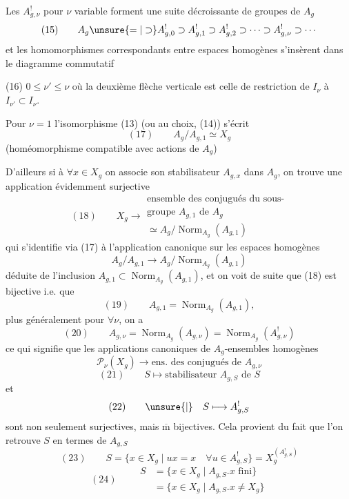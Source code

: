 Les $A_{g,\nu}^!$ pour $\nu$ variable forment une
suite décroissante de groupes de $A_g$
\[
(15)\qquad A_g\unsure{=|\supset}A_{g,0}^!\supset A_{g,1}^!\supset A_{g,2}^!
\supset\cdots\supset A_{g,\nu}^!\supset\cdots
\]
et les homomorphismes correspondants
entre espaces homogènes  s'insèrent dans le
diagramme commutatif  

(16)\quad
{}
\quad $0\leq\nu'\leq\nu$
où la deuxième flèche verticale est celle de
restriction de $I_\nu$ à $I_{\nu'}\subset I_\nu$.

Pour $\nu=1$  l'isomorphisme (13) (ou au choix,
(14)) s'écrit
\[
(17)\qquad A_g/A_{g,1}\simeq X_g
\]
(homéomorphisme compatible avec  actions de $A_g$)

D'ailleurs si à $\forall x\in X_g$ on associe son
stabilisateur $A_{g,x}$ dans $A_g$, on trouve une
application évidemment surjective
\[
(18)\qquad X_g\longrightarrow
\begin{gathered}
\text{ensemble des conjugués du sous-}\\
\text{groupe }A_{g,1}\text{ de }A_g\\
\simeq A_g/\operatorname{Norm}_{A_g}(A_{g,1})
\end{gathered}
\]
qui s'identifie via (17) à l'application canonique
sur les espaces homogènes
\[
 A_g/A_{g,1}\longrightarrow A_g/\operatorname{Norm}_{A_g}(A_{g,1})
\]
déduite de l'inclusion $A_{g,1}\subset\operatorname{Norm}_{A_g}(A_{g,1})$,
et on voit de suite que (18) est
bijective i.e. que 
\[
(19)\qquad A_{g,1}=\operatorname{Norm}_{A_g}(A_{g,1}),
\]
plus généralement pour $\forall\nu$, on a
\[
(20)\qquad A_{g,\nu}=\operatorname{Norm}_{A_g}(A_{g,\nu})
=\operatorname{Norm}_{A_g}(A_{g,\nu}^!)
\]
ce qui signifie que les applications canoniques
de $A_g$-ensembles homogènes
\[
\mathcal P_\nu(X_g)\longrightarrow\text{ens. des conjugués de }A_{g,\nu}
\]
\[
(21)\qquad S\longmapsto\text{stabilisateur }A_{g,S}\text{ de }S
\]
et
\[
(22)\qquad\unsure{\vert}\quad S\longmapsto A_{g,S}^!
\]
sont non seulement surjectives, mais $\overline{\mathrm m}$ bijectives.
Cela provient du fait que l'on retrouve
$S$ en termes de $A_{g,S}$\deleted{${}^!$} 
  
\[
(23)\qquad S=\{x\in X_g\mid ux=x\quad\forall u\in A_{g,S}^!\}
=X_g^{(A_{g,S}^!)}
\]
\[
(24)\qquad\begin{aligned}
S&=\{x\in X_g\mid A_{g,S}.x\text{ fini}\}\\
 &=\{x\in X_g\mid A_{g,S}.x\ne X_g\}
\end{aligned}
\]

